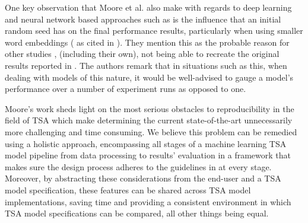 \documentclass[../../fyp.tex]{subfiles}
\begin{document}
One key observation that Moore et al. \cite{moore2018} also make with regards to deep learning and neural network based approaches such as \cite{tang2016b} is the influence that an initial random seed has on the final performance results, particularly when using smaller word embeddings (\cite{reimers2017} as cited in \cite{moore2018}). They mention this as the probable reason for other studies \cite{chen2017}, \cite{tay2017} (including their own), not being able to recreate the original results reported in \cite{tang2016b}. The authors remark that in situations such as this, when dealing with models of this nature, it would be well-advised to gauge a model's performance over a number of experiment runs as opposed to one.

Moore's work sheds light on the most serious obstacles to reproducibility in the field of TSA which make determining the current state-of-the-art unnecessarily more challenging and time consuming. We believe this problem can be remedied using a holistic approach, encompassing all stages of a machine learning TSA model pipeline from data processing to results' evaluation in a framework that makes sure the design process adheres to the guidelines in \cite{moore2018} at every stage. Moreover, by abstracting these considerations from the end-user and a TSA model specification, these features can be shared across TSA model implementations, saving time and providing a consistent environment in which TSA model specifications can be compared, all other things being equal. 
\end{document}
